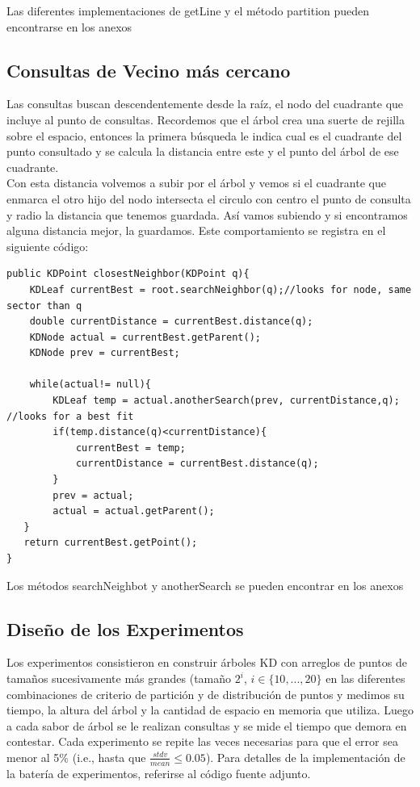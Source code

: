 \documentclass[12pt,letterpaper, margin = 3cm]{article}
\begin{document}
Las diferentes implementaciones de getLine y el método partition pueden encontrarse en los anexos

\subsection{Consultas de Vecino más cercano}

Las consultas buscan descendentemente desde la raíz, el nodo del cuadrante que incluye al punto de consultas. Recordemos que el árbol crea una suerte de rejilla sobre el espacio, entonces la primera búsqueda le indica cual es el cuadrante del punto consultado y se calcula la distancia entre este y el punto del árbol de ese cuadrante.\\
Con esta distancia volvemos a subir por el árbol y vemos si el cuadrante que enmarca el otro hijo del nodo intersecta el circulo con centro el punto de consulta y radio la distancia que tenemos guardada. Así vamos subiendo y si encontramos alguna distancia mejor, la guardamos. Este comportamiento se registra en el siguiente código:
\newpage
\begin{lstlisting}
public KDPoint closestNeighbor(KDPoint q){
    KDLeaf currentBest = root.searchNeighbor(q);//looks for node, same sector than q
    double currentDistance = currentBest.distance(q);
    KDNode actual = currentBest.getParent();
    KDNode prev = currentBest;  
    
    while(actual!= null){
        KDLeaf temp = actual.anotherSearch(prev, currentDistance,q); //looks for a best fit
        if(temp.distance(q)<currentDistance){
            currentBest = temp;
            currentDistance = currentBest.distance(q);
        }
        prev = actual;
        actual = actual.getParent();
   }
   return currentBest.getPoint();
}
\end{lstlisting}

Los métodos searchNeighbot y anotherSearch se pueden encontrar en los anexos
\newpage
\subsection{Diseño de los Experimentos}
Los experimentos consistieron en construir árboles KD con arreglos de puntos de tamaños sucesivamente más grandes (tamaño $2^i$, $i\in\{10,...,20\}$ en las diferentes combinaciones de criterio de partición y de distribución de puntos y medimos su tiempo, la altura del árbol y la cantidad de espacio en memoria que utiliza. Luego a cada sabor de árbol se le realizan consultas y se mide el tiempo que demora en contestar. Cada experimento se repite las veces necesarias para que el error sea menor al 5\% (i.e., hasta que $\frac{stdv}{mean}\leq 0.05$). Para detalles de la implementación de la batería de experimentos, referirse al código fuente adjunto.
\end{document}
